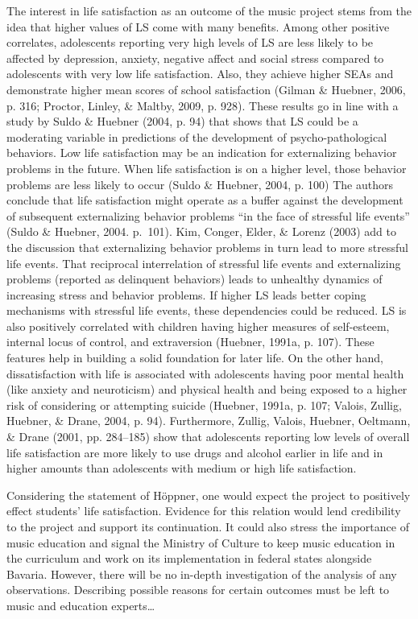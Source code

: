 \documentclass[a4, 12pt]{article}
\begin{document}
The interest in life satisfaction as an outcome of the music project stems from the idea that higher values of LS come with many benefits. Among other positive correlates, adolescents reporting very high levels of LS are less likely to be affected by depression, anxiety, negative affect and social stress compared to adolescents with very low life satisfaction. Also, they achieve higher SEAs and demonstrate higher mean scores of school satisfaction (Gilman \& Huebner, 2006, p. 316; Proctor, Linley, \& Maltby, 2009, p. 928). These results go in line with a study by Suldo \& Huebner (2004, p. 94) that shows that LS could be a moderating variable in predictions of the development of psycho-pathological behaviors. Low life satisfaction may be an indication for externalizing behavior problems in the future. When life satisfaction is on a higher level, those behavior problems are less likely to occur (Suldo \& Huebner, 2004, p. 100) The authors conclude that life satisfaction might operate as a buffer against the development of subsequent externalizing behavior problems ``in the face of stressful life events'' (Suldo \& Huebner, 2004. p.~101). Kim, Conger, Elder, \& Lorenz (2003) add to the discussion that externalizing behavior problems in turn lead to more stressful life events. That reciprocal interrelation of stressful life events and externalizing problems (reported as delinquent behaviors) leads to unhealthy dynamics of increasing stress and behavior problems. If higher LS leads better coping mechanisms with stressful life events, these dependencies could be reduced.
LS is also positively correlated with children having higher measures of self-esteem, internal locus of control, and extraversion (Huebner, 1991a, p. 107). These features help in building a solid foundation for later life. On the other hand, dissatisfaction with life is associated with adolescents having poor mental health (like anxiety and neuroticism) and physical health and being exposed to a higher risk of considering or attempting suicide (Huebner, 1991a, p. 107; Valois, Zullig, Huebner, \& Drane, 2004, p. 94). Furthermore, Zullig, Valois, Huebner, Oeltmann, \& Drane (2001, pp. 284--185) show that adolescents reporting low levels of overall life satisfaction are more likely to use drugs and alcohol earlier in life and in higher amounts than adolescents with medium or high life satisfaction.

Considering the statement of Höppner, one would expect the project to positively effect students' life satisfaction. Evidence for this relation would lend credibility to the project and support its continuation. It could also stress the importance of music education and signal the Ministry of Culture to keep music education in the curriculum and work on its implementation in federal states alongside Bavaria. However, there will be no in-depth investigation of the analysis of any observations. Describing possible reasons for certain outcomes must be left to music and education experts\ldots{}
\end{document}
